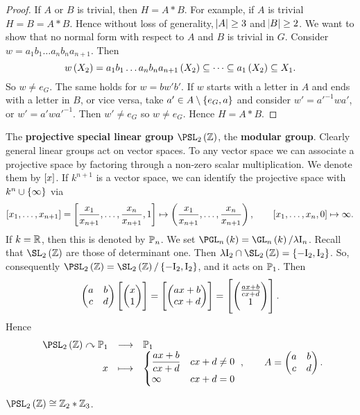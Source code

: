 \begin{proof}
If $ A $ or $ B $ is trivial, then $ H = A * B $. For example, if $ A $ is trivial $ H = B = A * B $. Hence without loss of generality, $ \abs{A} \ge 3 $ and $ \abs{B} \ge 2 $. We want to show that no normal form with respect to $ A $ and $ B $ is trivial in $ G $. Consider $ w = a_1b_1 \dots a_nb_na_{n + 1} $. Then
$$ w\br{X_2} = a_1b_1 \dots a_nb_na_{n + 1}\br{X_2} \subseteq \dots \subseteq a_1\br{X_2} \subseteq X_1. $$
So $ w \ne e_G $. The same holds for $ w = bw'b' $. If $ w $ starts with a letter in $ A $ and ends with a letter in $ B $, or vice versa, take $ a' \in A \setminus \cbr{e_G, a} $ and consider $ w' = a'^{-1}wa' $, or $ w' = a'wa'^{-1} $. Then $ w' \ne e_G $ so $ w \ne e_G $. Hence $ H = A * B $.
\end{proof}

\begin{example}
The \textbf{projective special linear group} $ \PSL_2\br{\ZZ} $, the \textbf{modular group}. Clearly general linear groups act on vector spaces. To any vector space we can associate a projective space by factoring through a non-zero scalar multiplication. We denote them by $ \sbr{x} $. If $ k^{n + 1} $ is a vector space, we can identify the projective space with $ k^n \cup \cbr{\infty} $ via
$$ \sbr{x_1, \dots, x_{n + 1}} = \sbr{\dfrac{x_1}{x_{n + 1}}, \dots, \dfrac{x_n}{x_{n + 1}}, 1} \mapsto \br{\dfrac{x_1}{x_{n + 1}}, \dots, \dfrac{x_n}{x_{n + 1}}}, \qquad \sbr{x_1, \dots, x_n, 0} \mapsto \infty. $$
If $ k = \mathbb{R} $, then this is denoted by $ \mathbb{P}_n $. We set $ \PGL_n\br{k} = \GL_n\br{k} / \lambda\I_n $. Recall that $ \SL_2\br{\ZZ} $ are those of determinant one. Then $ \lambda\I_2 \cap \SL_2\br{\ZZ} = \cbr{-\I_2, \I_2} $. So, consequently $ \PSL_2\br{\ZZ} = \SL_2\br{\ZZ} / \cbr{-\I_2, \I_2} $, and it acts on $ \mathbb{P}_1 $. Then
$$ \twobytwo{a}{b}{c}{d}\sbr{\twobyone{x}{1}} = \sbr{\twobyone{ax + b}{cx + d}} = \sbr{\twobyone{\tfrac{ax + b}{cx + d}}{1}}. $$
Hence
$$ \function{\PSL_2\br{\ZZ} \curvearrowright \PP_1}{\PP_1}{x}{
\begin{cases}
\dfrac{ax + b}{cx + d} & cx + d \ne 0 \\
\infty & cx + d = 0
\end{cases}
}, \qquad A = \twobytwo{a}{b}{c}{d}. $$
\end{example}

\pagebreak

\begin{lemma}
$ \PSL_2\br{\ZZ} \cong \ZZ_2 * \ZZ_3 $.
\end{lemma}

